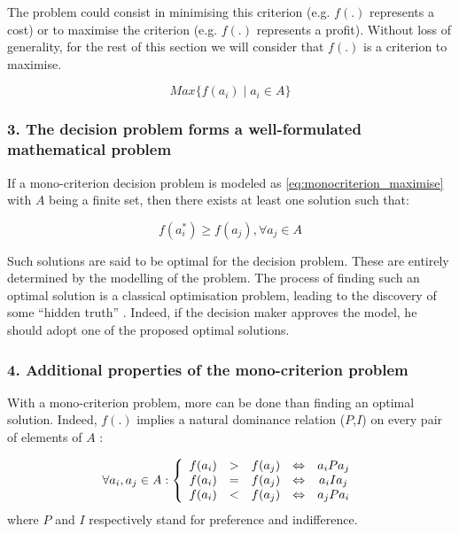 The problem could consist in minimising this criterion (e.g. $f(.)$ represents a cost) or to maximise the criterion (e.g. $f(.)$ represents a profit). Without loss of generality, for the rest of this section we will consider that $f(.)$ is a criterion to maximise.

\begin{equation}
    Max \{ f(a_i) \mid a_i \in A \}
    \label{eq:monocriterion_maximise}
\end{equation}

\subsubsection{ 3. The decision problem forms a well-formulated mathematical problem \cite{ROY1990324}}

If a mono-criterion decision problem is modeled as \eqref{eq:monocriterion_maximise} with $A$ being a finite set, then there exists at least one solution such that:

\begin{equation}
    f(a_i^*) \ge f(a_j), \forall a_j \in A
    \label{eq:monocriterion_optimal_solution}
\end{equation}

Such solutions are said to be optimal for the decision problem. These are entirely determined by the modelling of the problem. The process of finding such an optimal solution is a classical optimisation problem, leading to the discovery of some ``hidden truth'' \cite{ROY1990324}\cite{Vin92}. Indeed, if the decision maker approves the model, he should adopt one of the proposed optimal solutions.

\subsubsection{4. Additional properties of the mono-criterion problem}
With a mono-criterion problem, more can be done than finding an optimal solution. Indeed, $f(.)$ implies a natural dominance relation ($P$,$I$) on every pair of elements of $A$ \cite{Bertrand2002}:

\begin{equation}
    \forall a_i, a_j \in A: \left\{
        \begin{array}[]{l c c c c}
            f(a_i) & > & f(a_j) &\Leftrightarrow & a_iPa_j \\
            f(a_i) & = & f(a_j) &\Leftrightarrow & a_iIa_j \\
            f(a_i) & < & f(a_j) &\Leftrightarrow & a_jPa_i \\
        \end{array}
        \right .
    \label{eq:dominance_relation_monocriterion}
\end{equation}
where $P$ and $I$ respectively stand for preference and indifference.

